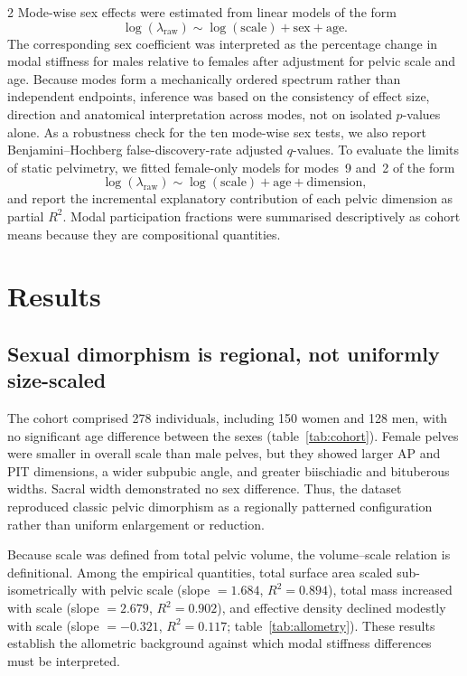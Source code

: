 \documentclass[openacc]{rsproca_new}
\begin{document}
\begin{multicols}{2}
Mode-wise sex effects were estimated from linear models of the form
\begin{equation}
\log(\lambda_{\mathrm{raw}}) \sim \log(\mathrm{scale}) + \mathrm{sex} + \mathrm{age}.
\end{equation}
The corresponding sex coefficient was interpreted as the percentage change in modal stiffness for males relative to females after adjustment for pelvic scale and age. Because modes form a mechanically ordered spectrum rather than independent endpoints, inference was based on the consistency of effect size, direction and anatomical interpretation across modes, not on isolated $p$-values alone. As a robustness check for the ten mode-wise sex tests, we also report Benjamini--Hochberg false-discovery-rate adjusted $q$-values. To evaluate the limits of static pelvimetry, we fitted female-only models for modes~9 and~2 of the form
\begin{equation}
\log(\lambda_{\mathrm{raw}}) \sim \log(\mathrm{scale}) + \mathrm{age} + \mathrm{dimension},
\end{equation}
and report the incremental explanatory contribution of each pelvic dimension as partial $R^2$. Modal participation fractions were summarised descriptively as cohort means because they are compositional quantities.

\section{Results}
\subsection{Sexual dimorphism is regional, not uniformly size-scaled}

The cohort comprised 278 individuals, including 150 women and 128 men, with no significant age difference between the sexes (table~\ref{tab:cohort}). Female pelves were smaller in overall scale than male pelves, but they showed larger AP and PIT dimensions, a wider subpubic angle, and greater biischiadic and bituberous widths. Sacral width demonstrated no sex difference. Thus, the dataset reproduced classic pelvic dimorphism as a regionally patterned configuration rather than uniform enlargement or reduction.

Because scale was defined from total pelvic volume, the volume--scale relation is definitional. Among the empirical quantities, total surface area scaled sub-isometrically with pelvic scale (slope $=1.684$, $R^2=0.894$), total mass increased with scale (slope $=2.679$, $R^2=0.902$), and effective density declined modestly with scale (slope $=-0.321$, $R^2=0.117$; table~\ref{tab:allometry}). These results establish the allometric background against which modal stiffness differences must be interpreted.


\end{multicols}
\end{document}
